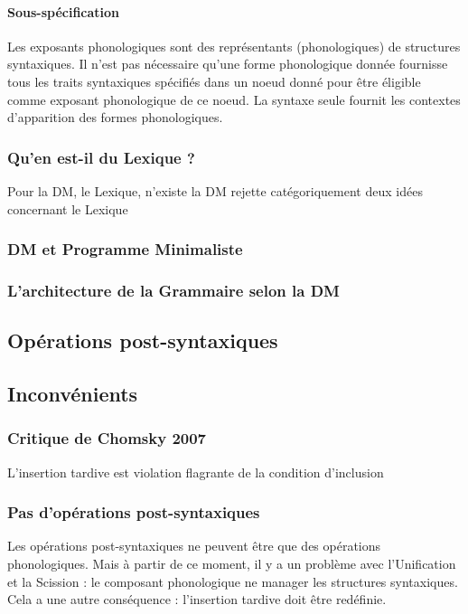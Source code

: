       \paragraph{Sous-sp\'ecification}
        Les exposants phonologiques sont des repr\'esentants (phonologiques) de structures syntaxiques. Il n'est pas n\'ecessaire qu'une forme phonologique donn\'ee fournisse tous les traits syntaxiques sp\'ecifi\'es dans un noeud donn\'e pour \^etre \'eligible comme exposant phonologique de ce noeud. La syntaxe seule fournit les contextes d'apparition des formes phonologiques. 
    \subsubsection{Qu'en est-il du Lexique ?}
        Pour la DM, le Lexique, n'existe la DM rejette cat\'egoriquement deux id\'ees concernant le Lexique 
    \subsubsection{DM et Programme Minimaliste}
    \subsubsection{L'architecture de la Grammaire selon la DM}
    \subsection{Op\'erations post-syntaxiques}
   
    \subsection{Inconv\'enients}
      \subsubsection{Critique de Chomsky 2007}
        L'insertion tardive est violation flagrante de la condition d'inclusion
      \subsubsection{Pas d'op\'erations post-syntaxiques}
        Les op\'erations post-syntaxiques ne peuvent \^etre que des op\'erations phonologiques. Mais \`a partir de ce moment, il y a un probl\`eme avec l'Unification et la Scission : le composant phonologique ne manager les structures syntaxiques. Cela a une autre cons\'equence : l'insertion tardive doit \^etre red\'efinie.
        
